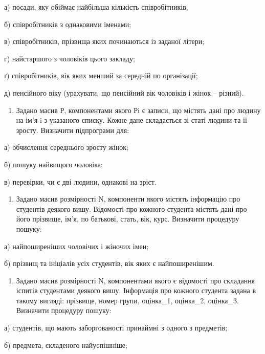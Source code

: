 \documentclass[]{article}
\begin{document}
а) посади, яку обіймає найбільша кількість співробітників;

б) співробітників з однаковими іменами;

в) співробітників, прізвища яких починаються із заданої літери;

г) найстаршого з чоловіків цього закладу;

ґ) співробітників, вік яких менший за середній по організації;

д) пенсійного віку (урахувати, що пенсійний вік чоловіків і жінок --
різний).

\begin{enumerate}
\def\labelenumi{\arabic{enumi})}
\setcounter{enumi}{6}
\item
  Задано масив Р, компонентами якого Рi є записи, що містять дані про
  людину на ім'я i з указаного списку. Кожне дане складається зі статі
  людини та її зросту. Визначити підпрограми для:
\end{enumerate}

а) обчислення середнього зросту жінок;

б) пошуку найвищого чоловіка;

в) перевірки, чи є дві людини, однакові на зріст.

\begin{enumerate}
\def\labelenumi{\arabic{enumi})}
\setcounter{enumi}{6}
\item
  Задано масив розмірності N, компоненти якого містять інформацію про
  студентів деякого вишу. Відомості про кожного студента містять дані
  про його прізвище, ім'я, по батькові, стать, вік, курс. Визначити
  процедуру пошуку:
\end{enumerate}

а) найпоширеніших чоловічих і жіночих імен;

б) прізвищ та ініціалів усіх студентів, вік яких є найпоширенішим.

\begin{enumerate}
\def\labelenumi{\arabic{enumi})}
\setcounter{enumi}{6}
\item
  Задано масив розмірності N, компонентами якого є відомості про
  складання іспитів студентами деякого вишу. Інформація про кожного
  студента задана в такому вигляді: прізвище, номер групи, оцінка\_1,
  оцінка\_2, оцінка\_3. Визначити процедуру пошуку:
\end{enumerate}

а) студентів, що мають заборгованості принаймні з одного з предметів;

б) предмета, складеного найуспішніше;
\end{document}
